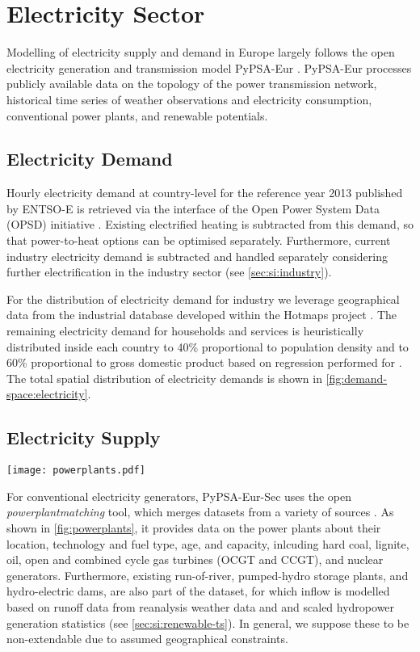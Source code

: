 \section{Electricity Sector}
\label{sec:si:electricity}

Modelling of electricity supply and demand in Europe largely follows the open
electricity generation and transmission model PyPSA-Eur
. PyPSA-Eur processes publicly available data on
the topology of the power transmission network, historical time series of
weather observations and electricity consumption, conventional power plants, and
renewable potentials.

\subsection{Electricity Demand}
\label{sec:si:electricity:demand}

Hourly electricity demand at country-level for the reference year 2013 published
by ENTSO-E is retrieved via the interface of the Open Power System Data (OPSD)
initiative \citeS{}. Existing electrified heating is subtracted from this
demand, so that power-to-heat options can be optimised separately. Furthermore,
current industry electricity demand is subtracted and handled separately
considering further electrification in the industry sector (see \cref{sec:si:industry}).

For the distribution of electricity demand for industry we leverage geographical
data from the industrial database developed within the Hotmaps project \citeS{}.
The remaining electricity demand for households and services is heuristically
distributed inside each country to 40\% proportional to population density and
to 60\% proportional to gross domestic product based on regression performed for
. The total spatial distribution of electricity
demands is shown in \cref{fig:demand-space:electricity}.

\subsection{Electricity Supply}

\begin{SCfigure}
    \caption{Powerplants.}
    \label{fig:powerplants}
    \texttt{[image: powerplants.pdf]}
\end{SCfigure}

For conventional electricity generators, PyPSA-Eur-Sec uses the open
\textit{powerplantmatching} tool, which merges datasets from a variety of
sources . As shown in \cref{fig:powerplants}, it
provides data on the power plants about their location, technology and fuel
type, age, and capacity, inlcuding hard coal, lignite, oil, open and combined
cycle gas turbines (OCGT and CCGT), and nuclear generators. Furthermore,
existing run-of-river, pumped-hydro storage plants, and hydro-electric dams, are
also part of the dataset, for which inflow is modelled based on runoff data from
reanalysis weather data and and scaled hydropower generation statistics (see
\cref{sec:si:renewable-ts}). In general, we suppose these to be non-extendable due to assumed
geographical constraints.

